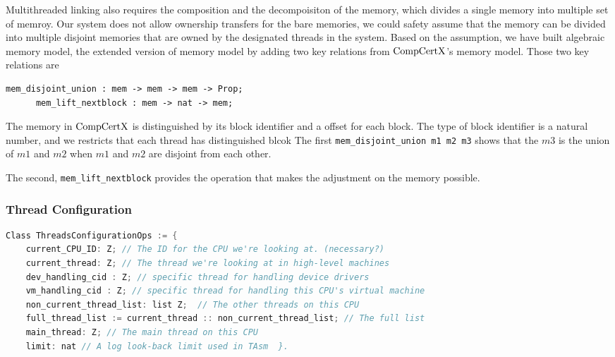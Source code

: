 Multithreaded linking also requires the composition and the decompoisiton of the memory,
which divides a single memory into multiple set of memroy. 
Our system does not allow ownership transfers for the bare memories, 
we could safety assume that the memory can be divided into 
multiple disjoint memories that are owned by the designated threads in the system. 
Based on the assumption, 
we have built algebraic memory model, the extended version of memory model by adding two key relations from $\mathrm{CompCertX}$'s memory model.
Those two key relations are 
\begin{lstlisting}[language=Caml]
      mem_disjoint_union : mem -> mem -> mem -> Prop;
      mem_lift_nextblock : mem -> nat -> mem;
\end{lstlisting}
The memory in $\mathrm{CompCertX}$ is 
distinguished by its block identifier and a offset for each block. 
The type of block identifier is a natural number,
and we restricts that each thread has distinguished blcok  
The first \lstinline$mem_disjoint_union m1 m2 m3$  shows that 
the $m3$ is the union of $m1$ and $m2$ when $m1$ and $m2$ 
are disjoint from each other. 

The second, \lstinline$mem_lift_nextblock$ 
provides the operation that makes 
the adjustment on the memory possible. 


\subsubsection{Thread Configuration}
\begin{lstlisting}[language=C]
Class ThreadsConfigurationOps := {      
    current_CPU_ID: Z; // The ID for the CPU we're looking at. (necessary?) 
    current_thread: Z; // The thread we're looking at in high-level machines
    dev_handling_cid : Z; // specific thread for handling device drivers 
    vm_handling_cid : Z; // specific thread for handling this CPU's virtual machine 
    non_current_thread_list: list Z;  // The other threads on this CPU 
    full_thread_list := current_thread :: non_current_thread_list; // The full list
    main_thread: Z; // The main thread on this CPU 
    limit: nat // A log look-back limit used in TAsm  }.
\end{lstlisting}

